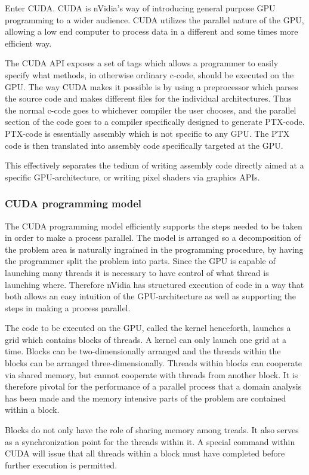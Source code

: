 Enter CUDA. CUDA is nVidia's way of introducing general purpose GPU programming to a wider audience. CUDA utilizes the parallel nature of the GPU, allowing a low end computer to process data in a different and some times more efficient way.

The CUDA API exposes a set of tags which allows a programmer to easily specify what methods, in otherwise ordinary c-code, should be executed on the GPU. The way CUDA makes it possible is by using a preprocessor which parses the source code and makes different files for the individual architectures. Thus the normal c-code goes to whichever compiler the user chooses, and the parallel section of the code goes to a compiler specifically designed to generate PTX-code. PTX-code is essentially assembly which is not specific to any GPU. The PTX code is then translated into assembly code specifically targeted at the GPU.

This effectively separates the tedium of writing assembly code directly aimed at a specific GPU-architecture, or writing pixel shaders via graphics APIs.

\subsubsection{CUDA programming model}
The CUDA programming model efficiently supports the steps needed to be taken in order to make a process parallel. The model is arranged so a decomposition of the problem area is naturally ingrained in the programming procedure, by having the programmer split the problem into parts. Since the GPU is capable of launching many threads it is necessary to have control of what thread is launching where. Therefore nVidia has structured execution of code in a way that both allows an easy intuition of the GPU-architecture as well as supporting the steps in making a process parallel.

The code to be executed on the GPU, called the kernel henceforth, launches a grid which contains blocks of threads. A kernel can only launch one grid at a time. Blocks can be two-dimensionally arranged and the threads within the blocks can be arranged three-dimensionally. Threads within blocks can cooperate via shared memory, but cannot cooperate with threads from another block. It is therefore pivotal for the performance of a parallel process that a domain analysis has been made and the memory intensive parts of the problem are contained within a block.

Blocks do not only have the role of sharing memory among treads. It also serves as a synchronization point for the threads within it. A special command within CUDA will issue that all threads within a block must have completed before further execution is permitted.

